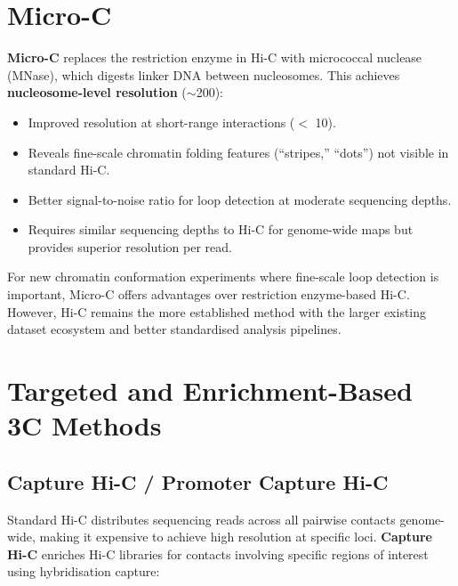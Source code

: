 \section{Micro-C}
\label{sec:3dgenome:microc}

\textbf{Micro-C} replaces the restriction enzyme in Hi-C with micrococcal nuclease (MNase), which digests linker DNA between nucleosomes. This achieves \textbf{nucleosome-level resolution} ($\sim$200\basepair{}):

\begin{itemize}[itemsep=2pt]
  \item Improved resolution at short-range interactions ($<$ 10\kilobase{}).
  \item Reveals fine-scale chromatin folding features (``stripes,'' ``dots'') not visible in standard Hi-C.
  \item Better signal-to-noise ratio for loop detection at moderate sequencing depths.
  \item Requires similar sequencing depths to Hi-C for genome-wide maps but provides superior resolution per read.
\end{itemize}

\begin{tipbox}
For new chromatin conformation experiments where fine-scale loop detection is important, Micro-C offers advantages over restriction enzyme-based Hi-C. However, Hi-C remains the more established method with the larger existing dataset ecosystem and better standardised analysis pipelines.
\end{tipbox}

\section{Targeted and Enrichment-Based 3C Methods}
\label{sec:3dgenome:targeted}

\subsection{Capture Hi-C / Promoter Capture Hi-C}
\label{subsec:3dgenome:capture-hic}

Standard Hi-C distributes sequencing reads across all pairwise contacts genome-wide, making it expensive to achieve high resolution at specific loci. \textbf{Capture Hi-C} enriches Hi-C libraries for contacts involving specific regions of interest using hybridisation capture:


